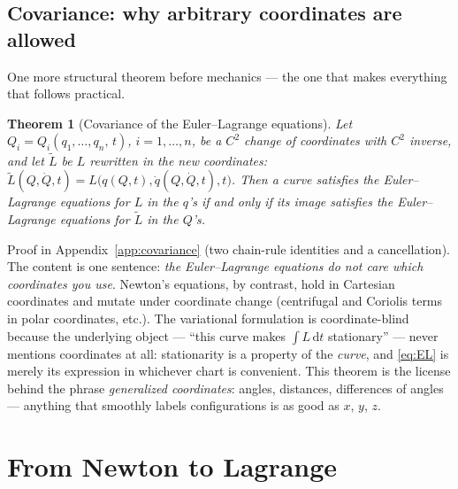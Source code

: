 \documentclass[11pt]{article}
\theoremstyle{plain}
\newtheorem{theorem}{Theorem}[section]
\theoremstyle{definition}
\theoremstyle{remark}
\newcommand{\dd}{\mathrm{d}}
\begin{document}
\subsection{Covariance: why arbitrary coordinates are allowed}
\label{sec:covariance}

One more structural theorem before mechanics --- the one that makes
everything that follows practical.

\begin{theorem}[Covariance of the Euler--Lagrange equations]
\label{thm:covariance}
Let $Q_i = Q_i(q_1,\dots,q_n,\,t)$, $i = 1,\dots,n$, be a $C^2$ change of
coordinates with $C^2$ inverse, and let $\widetilde L$ be $L$ rewritten in
the new coordinates:
$\widetilde L(Q, \dot Q, t) = L\bigl(q(Q,t), \dot q(Q,\dot Q,t), t\bigr)$.
Then a curve satisfies the Euler--Lagrange equations for $L$ in the $q$'s
\emph{if and only if} its image satisfies the Euler--Lagrange equations for
$\widetilde L$ in the $Q$'s.
\end{theorem}

Proof in Appendix~\ref{app:covariance} (two chain-rule identities and a
cancellation). The content is one sentence:
\emph{the Euler--Lagrange equations do not care which coordinates you use}.
Newton's equations, by contrast, hold in Cartesian coordinates and mutate
under coordinate change (centrifugal and Coriolis terms in polar
coordinates, etc.). The variational formulation is coordinate-blind
because the underlying object --- ``this curve makes $\int L\,\dd t$
stationary'' --- never mentions coordinates at all: stationarity is a
property of the \emph{curve}, and \eqref{eq:EL} is merely its expression
in whichever chart is convenient. This theorem is the license behind the
phrase \emph{generalized coordinates}: angles, distances, differences of
angles --- anything that smoothly labels configurations is as good as $x$,
$y$, $z$.

\section{From Newton to Lagrange}
\label{sec:newton-lagrange}
\end{document}
